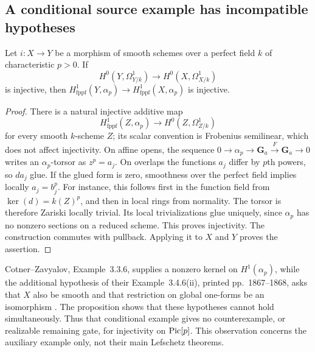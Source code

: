 \subsection{A conditional source example has incompatible hypotheses}
\begin{proposition}\label{a:cz-vacuity}
Let $i:X\to Y$ be a morphism of smooth schemes over a perfect field
$k$ of characteristic $p>0$. If
\[
 H^0(Y,\Omega^1_{Y/k})\longrightarrow H^0(X,\Omega^1_{X/k})
\]
is injective, then
$H^1_{\mathrm{fppf}}(Y,\alpha_p)\to
 H^1_{\mathrm{fppf}}(X,\alpha_p)$ is injective.
\end{proposition}
\begin{proof}
There is a natural injective additive map
\[
 H^1_{\mathrm{fppf}}(Z,\alpha_p)
       \longrightarrow H^0(Z,\Omega^1_{Z/k})
\]
for every smooth $k$-scheme $Z$; its scalar convention is Frobenius
semilinear, which does not affect injectivity. On affine opens,
the sequence $0\to\alpha_p\to\mathbf G_a\xrightarrow{F}\mathbf G_a\to0$
writes an $\alpha_p$-torsor as $z^p=a_j$. On overlaps the functions
$a_j$ differ by $p$th powers, so $da_j$ glue. If the glued form is
zero, smoothness over the perfect field implies locally
$a_j=b_j^p$. For instance, this follows first in the function field
from $\ker(d)=k(Z)^p$, and then in local rings from normality.
The torsor is therefore Zariski locally trivial. Its local
trivializations glue uniquely, since $\alpha_p$ has no nonzero
sections on a reduced scheme. This proves injectivity.
The construction commutes with pullback. Applying it to $X$ and
$Y$ proves the assertion.
\end{proof}

Cotner--Zavyalov, Example~3.3.6, supplies a nonzero kernel on
$H^1(\alpha_p)$, while the additional hypothesis of their
Example~3.4.6(ii), printed pp.~1867--1868, asks that $X$ also be
smooth and that restriction on global one-forms be an isomorphism
\cite{CotnerZavyalov2024}. The proposition shows that these
hypotheses cannot hold simultaneously. Thus that conditional
example gives no counterexample, or realizable remaining gate,
for injectivity on $\operatorname{Pic}[p]$. This observation concerns the
auxiliary example only, not their main Lefschetz theorems.








